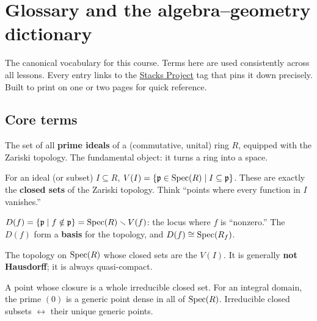 \chapter{Glossary and the algebra--geometry dictionary}\label{ch:refA-glossary}

\noindent The canonical vocabulary for this course. Terms here are used consistently
across all lessons. Every entry links to the \href{https://stacks.math.columbia.edu/}{Stacks
Project} tag that pins it down precisely. Built to print on one or two pages for quick reference.

\section{Core terms}

\begin{defbox}
The set of all \textbf{prime ideals} of a (commutative, unital) ring $R$, equipped with the
Zariski topology. The fundamental object: it turns a ring into a space.
\hfill{}
\end{defbox}

\begin{defbox}
For an ideal (or subset) $I\subseteq R$, $V(I)=\{\mathfrak{p}\in\operatorname{Spec}(R)\mid I\subseteq\mathfrak{p}\}$. These are
exactly the \textbf{closed sets} of the Zariski topology. Think ``points where every function
in $I$ vanishes.''\hfill{}
\end{defbox}

\begin{defbox}
$D(f)=\{\mathfrak{p}\mid f\notin\mathfrak{p}\}=\operatorname{Spec}(R)\smallsetminus V(f)$: the locus where $f$ is ``nonzero.'' The
$D(f)$ form a \textbf{basis} for the topology, and $D(f)\cong\operatorname{Spec}(R_f)$.\hfill{}
\end{defbox}

\begin{defbox}
The topology on $\operatorname{Spec}(R)$ whose closed sets are the $V(I)$. It is generally \textbf{not
Hausdorff}; it is always quasi-compact.\hfill{}
\end{defbox}

\begin{defbox}
A point whose closure is a whole irreducible closed set. For an integral domain, the prime $(0)$
is a generic point dense in all of $\operatorname{Spec}(R)$. Irreducible closed subsets $\leftrightarrow$ their
unique generic points.\hfill{}
\end{defbox}

